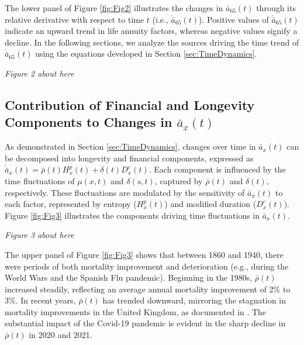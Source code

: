 \documentclass[12pt]{article}
\begin{document}
The lower panel of Figure \ref{fig:Fig2} illustrates the changes in \( \bar{a}_{65}(t) \) through its relative derivative with respect to time \( t \) (i.e., \( \acute{\bar{a}}_{65}(t) \)). Positive values of \( \acute{\bar{a}}_{65}(t) \) indicate an upward trend in life annuity factors, whereas negative values signify a decline. In the following sections, we analyze the sources driving the time trend of \( \acute{\bar{a}}_{65}(t) \) using the equations developed in Section \ref{sec:TimeDynamics}.


\begin{center}
	\textit{Figure 2 about here}
\end{center}

\subsection{Contribution of Financial and Longevity Components to Changes in $\bar{a}_x(t)$}

As demonstrated in Section \ref{sec:TimeDynamics}, changes over time in \( \bar{a}_x(t) \) can be decomposed into longevity and financial components, expressed as \( \acute{\bar{a}}_x(t) = \bar{\rho}(t) {H}^{p}_x(t) + \dot{\delta}(t) D^{c}_x(t) \). Each component is influenced by the time fluctuations of \( \mu(x,t) \) and \( \delta(s,t) \), captured by \( \bar{\rho}(t) \) and \( \dot{\delta}(t) \), respectively. These fluctuations are modulated by the sensitivity of \( \bar{a}_x(t) \) to each factor, represented by entropy (\( {H}^{p}_x(t) \)) and modified duration (\( {D}^{c}_x(t) \)). Figure \ref{fig:Fig3} illustrates the components driving time fluctuations in \( \bar{a}_x(t) \).


\begin{center}
	\textit{Figure 3 about here}
\end{center}

The upper panel of Figure \ref{fig:Fig3} shows that between 1860 and 1940, there were periods of both mortality improvement and deterioration (e.g., during the World Wars and the Spanish Flu pandemic). Beginning in the 1980s, \( \bar{\rho}(t) \) increased steadily, reflecting an average annual mortality improvement of 2\% to 3\%. In recent years, \( \bar{\rho}(t) \) has trended downward, mirroring the stagnation in mortality improvements in the United Kingdom, as documented in \citep{djeundje2022slowdown}. The substantial impact of the Covid-19 pandemic is evident in the sharp decline in \( \bar{\rho}(t) \) in 2020 and 2021.
\end{document}
